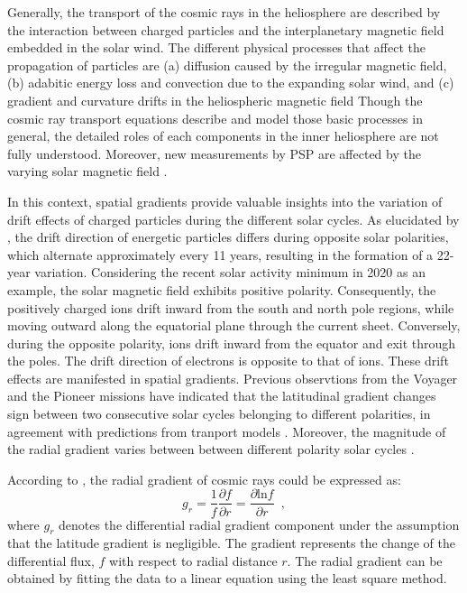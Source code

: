 Generally, the transport of the cosmic rays in the heliosphere are described by the interaction between charged particles and the interplanetary magnetic field embedded in the solar wind. The different physical processes that affect the propagation of particles are (a) diffusion caused by the irregular magnetic field, (b) adabitic energy loss and convection due to the expanding solar wind, and (c) gradient and curvature drifts in the heliospheric magnetic field
Though the cosmic ray transport equations describe and model those basic processes \citep{Parker1965Pss,Jokipii1977ApJ,Jokipii1981ApJ,McDonald2001ICRC} in general, the detailed roles of each components in the inner heliosphere are not fully understood. Moreover, new measurements by \ac{PSP} are affected by the varying solar magnetic field \citep{Rankin2021ApJ}.

In this context, spatial gradients provide valuable insights into the variation of drift effects of charged particles during the different solar cycles. As elucidated by \citet{Jokipii1977ApJ, Jokipii1979ApJ, Potgieter2013LRSP}, the drift direction of energetic particles differs during opposite solar polarities, which alternate approximately every 11 years, resulting in the formation of a 22-year variation. Considering the recent solar activity minimum in 2020 as an example, the solar magnetic field exhibits positive polarity. Consequently, the positively charged ions drift inward from the south and north pole regions, while moving outward along the equatorial plane through the current sheet. Conversely, during the opposite polarity, ions drift inward from the equator and exit through the poles. The drift direction of electrons is opposite to that of ions. These drift effects are manifested in spatial gradients. Previous observtions from the Voyager and the Pioneer missions have indicated that the latitudinal gradient changes sign between two consecutive solar cycles belonging to different polarities, in agreement with predictions from tranport models \citep{Mckibben1979ApJ, Cummings1987GeoRL, Christon1986JGR}. Moreover, the magnitude of the radial gradient varies between between different polarity solar cycles \citep{Rankin2021ApJ,Rankin2022ApJ,Giacalone2022SSRv,Webber1981JGR,Marsden1999AdSpR}.

According to \citet{Rankin2021ApJ}, the radial gradient of cosmic rays could be expressed as:
\begin{equation}
    g_r = \frac{1}{f}\frac{\partial{f}}{\partial{r}} = \frac{\partial{\mathrm{ln} f}}{\partial{r}} \enspace ,
    \label{eq:radial_gradient}
\end{equation}
where $g_r$ denotes the differential radial gradient component under the assumption that the latitude gradient is negligible. The gradient represents the change of the differential flux, $f$ with respect to radial distance $r$. The radial gradient can be obtained by fitting the data to a linear equation using the least square method.


